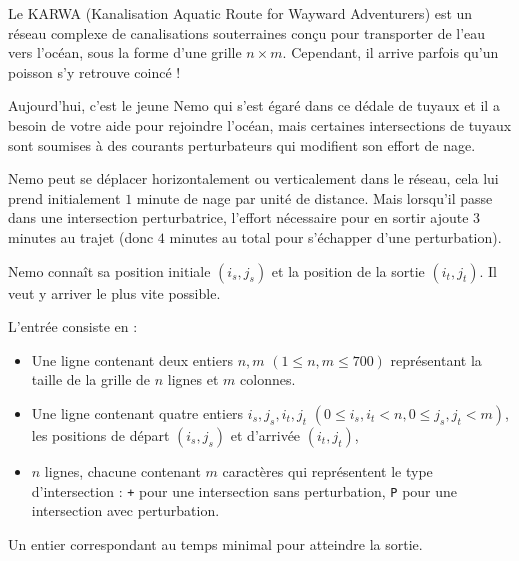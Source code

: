 \problemname{}


Le KARWA (Kanalisation Aquatic Route for Wayward Adventurers) est un réseau complexe de canalisations souterraines conçu pour transporter de l'eau vers l'océan, sous la forme d'une grille $n \times m$. Cependant, il arrive parfois qu'un poisson s'y retrouve coincé !

Aujourd'hui, c'est le jeune Nemo qui s'est égaré dans ce dédale de tuyaux et il a besoin de votre aide pour rejoindre l'océan, mais certaines intersections de tuyaux sont soumises à des courants perturbateurs qui modifient son effort de nage.

Nemo peut se déplacer horizontalement ou verticalement dans le réseau, cela lui prend initialement $1$ minute de nage par unité de distance. Mais lorsqu'il passe dans une intersection perturbatrice, l'effort nécessaire pour en sortir ajoute $3$ minutes au trajet (donc $4$ minutes au total pour s'échapper d'une perturbation).

Nemo connaît sa position initiale $(i_s, j_s)$ et la position de la sortie $(i_t, j_t)$. Il veut y arriver le plus vite possible.

\begin{Input}
    L'entrée consiste en :
    \begin{itemize}
        \item Une ligne contenant deux entiers $n, m$ $(1 \leq n, m \leq 700)$ représentant la taille de la grille de $n$ lignes et $m$ colonnes.
        \item Une ligne contenant quatre entiers $i_s, j_s, i_t, j_t$ $(0 \leq i_s, i_t < n, 0 \leq j_s, j_t < m)$, les positions de départ $(i_s,j_s)$ et d'arrivée $(i_t,j_t)$,
        \item $n$ lignes, chacune contenant $m$ caractères qui représentent le type d'intersection : \texttt{+} pour une intersection sans perturbation, \texttt{P} pour une intersection avec perturbation.
    \end{itemize}
\end{Input}

\begin{Output}
    Un entier correspondant au temps minimal pour atteindre la sortie.
\end{Output}